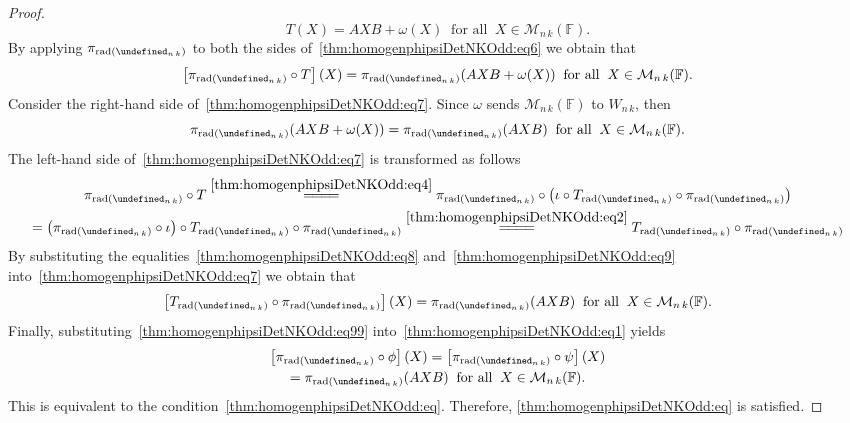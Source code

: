 \documentclass{elsarticle}
\let\det\undefined
\DeclareMathOperator{\det}{det}
\DeclareMathOperator{\rad}{rad}
\def\F{{\mathbb F}}
\def\M{{\mathcal M}}
\theoremstyle{definition}
\numberwithin{equation}{section}
\begin{document}
\begin{proof}
\begin{equation}\label{thm:homogenphipsiDetNKOdd:eq6}
T(X) = AXB + \omega(X)\;\;\mbox{for all}\;\;X \in \M_{n\,k}(\F).
\end{equation}
By applying $\pi_{\rad (\det_{n\,k})}$ to both the sides of~\eqref{thm:homogenphipsiDetNKOdd:eq6} we obtain that
\begin{equation}\label{thm:homogenphipsiDetNKOdd:eq7}
\left[\pi_{\rad (\det_{n\,k})} \circ  T\right](X) = \pi_{\rad (\det_{n\,k})}(AXB + \omega(X))\;\;\mbox{for all}\;\;X \in \M_{n\,k}(\F).
\end{equation}
Consider the right-hand side of~\eqref{thm:homogenphipsiDetNKOdd:eq7}. Since $\omega$ sends $ \M_{n\,k}(\F)$ to $W_{n\,k}$, then
\begin{equation}\label{thm:homogenphipsiDetNKOdd:eq8}
\pi_{\rad (\det_{n\,k})}(AXB + \omega(X)) = \pi_{\rad (\det_{n\,k})}(AXB)\;\;\mbox{for all}\;\;X \in \M_{n\,k}(\F).
\end{equation}
The left-hand side of~\eqref{thm:homogenphipsiDetNKOdd:eq7} is transformed as follows
\begin{multline}\label{thm:homogenphipsiDetNKOdd:eq9}
\pi_{\rad (\det_{n\,k})} \circ  T \overset{\eqref{thm:homogenphipsiDetNKOdd:eq4}}{=\joinrel=\joinrel=\joinrel=} \pi_{\rad (\det_{n\,k})} \circ \left(\iota \circ T_{\rad (\det_{n\,k})} \circ \pi_{\rad (\det_{n\,k})}\right)\\
= \left(\pi_{\rad (\det_{n\,k})} \circ \iota \right) \circ T_{\rad (\det_{n\,k})} \circ \pi_{\rad (\det_{n\,k})} \overset{\eqref{thm:homogenphipsiDetNKOdd:eq2}}{=\joinrel=\joinrel=\joinrel=} T_{\rad (\det_{n\,k})} \circ \pi_{\rad (\det_{n\,k})} 
\end{multline}
By substituting the equalities~\eqref{thm:homogenphipsiDetNKOdd:eq8} and~\eqref{thm:homogenphipsiDetNKOdd:eq9} into~\eqref{thm:homogenphipsiDetNKOdd:eq7} we obtain that
\begin{equation}\label{thm:homogenphipsiDetNKOdd:eq99}
\left[T_{\rad (\det_{n\,k})} \circ \pi_{\rad (\det_{n\,k})}\right](X) = \pi_{\rad (\det_{n\,k})}(AXB)\;\;\mbox{for all}\;\;X \in \M_{n\,k}(\F).
\end{equation}
Finally, substituting~\eqref{thm:homogenphipsiDetNKOdd:eq99} into~\eqref{thm:homogenphipsiDetNKOdd:eq1} yields
\begin{multline*}
\left[\pi_{\rad (\det_{n\,k})} \circ \phi\right](X) = \left[\pi_{\rad (\det_{n\,k})} \circ \psi\right](X)\\ = \pi_{\rad (\det_{n\,k})}(AXB)\;\;\mbox{for all}\;\;X \in \M_{n\,k}(\F).
\end{multline*}
This is equivalent to the condition~\eqref{thm:homogenphipsiDetNKOdd:eq}. Therefore, \eqref{thm:homogenphipsiDetNKOdd:eq} is satisfied.
\end{proof}
\end{document}
